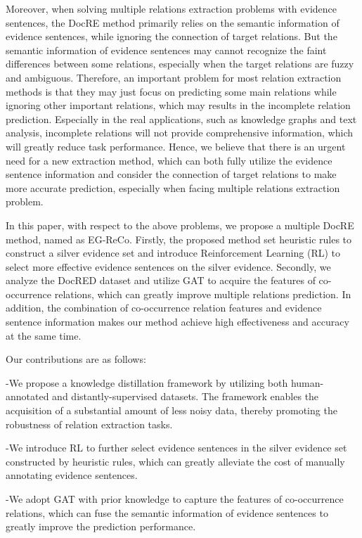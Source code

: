 \documentclass[preprint,12pt]{elsarticle}
\begin{document}
Moreover, when solving multiple relations extraction problems with evidence sentences, the DocRE method primarily relies on the semantic information of evidence sentences\cite{huang2021entity,huang-etal-2021-three}, while ignoring the connection of target relations. But the semantic information of evidence sentences may cannot recognize the faint differences between some relations, especially when the target relations are fuzzy and ambiguous\cite{che2022label}.  Therefore, an important problem for most relation extraction methods is that they may just focus on predicting some main relations while ignoring other important relations, which may results in the incomplete relation prediction. Especially in the real applications, such as knowledge graphs and text analysis, incomplete relations will not provide comprehensive information, which will greatly reduce task performance. Hence, we believe that there is an urgent need for a new extraction method, which can both fully utilize the evidence sentence information and consider the connection of target relations to make more accurate prediction, especially when facing multiple relations extraction problem.

In this paper, with respect to the above problems, we propose a multiple DocRE method, named as EG-ReCo. Firstly, the proposed method set heuristic rules to construct a silver evidence set and introduce Reinforcement Learning (RL) to select more effective evidence sentences on the silver evidence. Secondly, we analyze the DocRED dataset and utilize GAT to acquire the features of co-occurrence relations, which can greatly improve multiple relations prediction. In addition, the combination of co-occurrence relation features and evidence sentence information makes our method achieve high effectiveness and accuracy at the same time.

Our contributions are as follows:

-We propose a knowledge distillation framework by utilizing both human-annotated and distantly-supervised datasets. The framework enables the acquisition of a substantial amount of less noisy data, thereby promoting the robustness of relation extraction tasks.

-We introduce RL to further select evidence sentences in the silver evidence set constructed by heuristic rules, which can greatly alleviate the cost of manually annotating evidence sentences.

-We adopt GAT with prior knowledge to capture the features of co-occurrence relations, which can fuse the semantic information of evidence sentences to  greatly improve the prediction performance.
\end{document}
